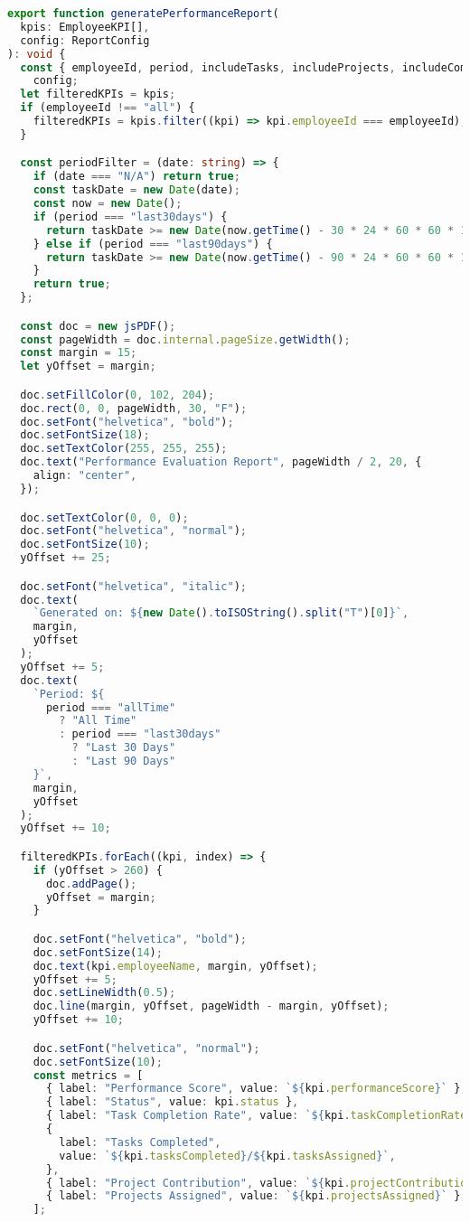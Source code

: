 \begin{lstlisting}[language=Typescript, caption=Тайлан автоматаар гаргах, frame=single]
export function generatePerformanceReport(
  kpis: EmployeeKPI[],
  config: ReportConfig
): void {
  const { employeeId, period, includeTasks, includeProjects, includeComments } =
    config;
  let filteredKPIs = kpis;
  if (employeeId !== "all") {
    filteredKPIs = kpis.filter((kpi) => kpi.employeeId === employeeId);
  }

  const periodFilter = (date: string) => {
    if (date === "N/A") return true;
    const taskDate = new Date(date);
    const now = new Date();
    if (period === "last30days") {
      return taskDate >= new Date(now.getTime() - 30 * 24 * 60 * 60 * 1000);
    } else if (period === "last90days") {
      return taskDate >= new Date(now.getTime() - 90 * 24 * 60 * 60 * 1000);
    }
    return true;
  };

  const doc = new jsPDF();
  const pageWidth = doc.internal.pageSize.getWidth();
  const margin = 15;
  let yOffset = margin;

  doc.setFillColor(0, 102, 204);
  doc.rect(0, 0, pageWidth, 30, "F");
  doc.setFont("helvetica", "bold");
  doc.setFontSize(18);
  doc.setTextColor(255, 255, 255);
  doc.text("Performance Evaluation Report", pageWidth / 2, 20, {
    align: "center",
  });

  doc.setTextColor(0, 0, 0);
  doc.setFont("helvetica", "normal");
  doc.setFontSize(10);
  yOffset += 25;

  doc.setFont("helvetica", "italic");
  doc.text(
    `Generated on: ${new Date().toISOString().split("T")[0]}`,
    margin,
    yOffset
  );
  yOffset += 5;
  doc.text(
    `Period: ${
      period === "allTime"
        ? "All Time"
        : period === "last30days"
          ? "Last 30 Days"
          : "Last 90 Days"
    }`,
    margin,
    yOffset
  );
  yOffset += 10;

  filteredKPIs.forEach((kpi, index) => {
    if (yOffset > 260) {
      doc.addPage();
      yOffset = margin;
    }

    doc.setFont("helvetica", "bold");
    doc.setFontSize(14);
    doc.text(kpi.employeeName, margin, yOffset);
    yOffset += 5;
    doc.setLineWidth(0.5);
    doc.line(margin, yOffset, pageWidth - margin, yOffset);
    yOffset += 10;

    doc.setFont("helvetica", "normal");
    doc.setFontSize(10);
    const metrics = [
      { label: "Performance Score", value: `${kpi.performanceScore}` },
      { label: "Status", value: kpi.status },
      { label: "Task Completion Rate", value: `${kpi.taskCompletionRate}%` },
      {
        label: "Tasks Completed",
        value: `${kpi.tasksCompleted}/${kpi.tasksAssigned}`,
      },
      { label: "Project Contribution", value: `${kpi.projectContribution}%` },
      { label: "Projects Assigned", value: `${kpi.projectsAssigned}` },
    ];


\end{lstlisting}
